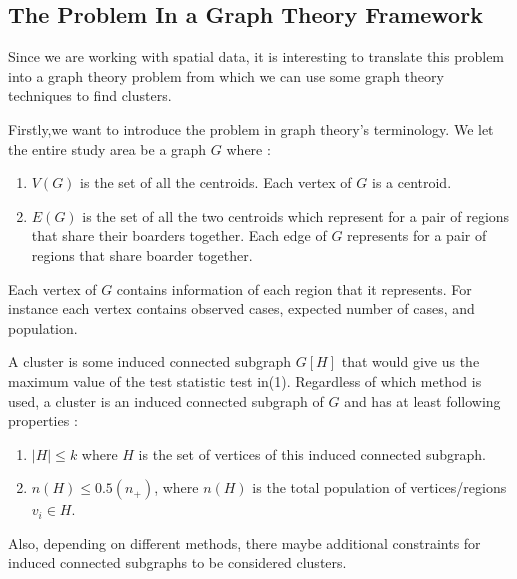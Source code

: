 \documentclass[12pt]{article}
\begin{document}
				\subsection{The Problem In a Graph Theory Framework} 
				
				Since we are working with spatial data, it is interesting to translate this problem into a graph theory problem from which we can use some graph theory techniques to find clusters. 
				
				Firstly,we want to introduce the problem in graph theory's terminology. We let the entire study area be a graph $G$ where : \\
				\begin{enumerate}
					
				\item $V(G)$ is the set of all the centroids. Each vertex of $G$ is a centroid. \\
				\item $E(G)$ is the set of all the two centroids which represent for a pair of regions that share their boarders together. Each edge of $G$ represents for a pair of regions that share boarder together.\\
				\end{enumerate}
				
				Each vertex of $G$ contains information of each region that it represents. For instance  each vertex contains observed cases, expected number of cases, and population.
				
				A cluster is some induced connected subgraph $G[H]$ that would give us the maximum value of the test statistic test in(1). Regardless of which method is used, a cluster is an induced connected subgraph of $G$ and has at least following properties : \\
				\begin{enumerate}
					
					\item $|H| \leq k $ where $H$ is the set of vertices of this induced connected subgraph.
					\item $n(H) \leq 0.5(n_+)$, where $n(H)$ is the total population of vertices/regions $v_i \in H$. 
				\end{enumerate}
				Also, depending on different methods, there maybe additional constraints for induced connected subgraphs to be considered clusters.\\ 	
			
\end{document}

